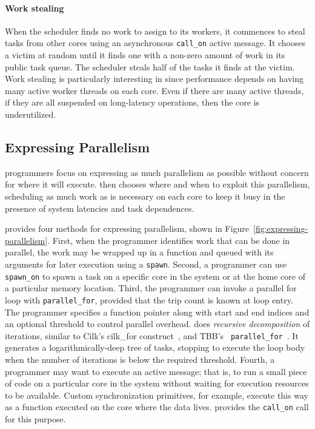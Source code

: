 \paragraph{Work stealing} 
When the scheduler finds no work to assign to its workers, it commences to
steal tasks from other cores using an asynchronous \texttt{call\_on} active
message. It chooses a victim at random until it finds one with a non-zero
amount of work in its public task queue. The scheduler steals half of the
tasks it finds at the victim. Work stealing is particularly interesting in
\Grappa since performance depends on having many active worker threads on each
core. Even if there are many active threads, if they are all suspended on
long-latency operations, then the core is underutilized.

\subsection{Expressing Parallelism}

\Grappa programmers focus on expressing as much parallelism as possible
without concern for where it will execute. \Grappa then chooses where and when
to exploit this parallelism, scheduling as much work as is necessary on each
core to keep it busy in the presence of system latencies and task dependences.

\Grappa provides four methods for expressing parallelism, shown in
Figure~\ref{fig:expressing-parallelism}. First, when the programmer identifies
work that can be done in parallel, the work may be wrapped up in a function
and queued with its arguments for later execution using a \texttt{spawn}.
Second, a programmer can use \texttt{spawn\_on} to spawn a task on a specific
core in the system or at the home core of a particular memory location. Third,
the programmer can invoke a parallel for loop with \texttt{parallel\_for}, provided that the trip count is
known at loop entry. The programmer specifies a function pointer along with
start and end indices and an optional threshold to control parallel overhead.
\Grappa does {\em recursive decomposition} of iterations, similar to Cilk's
cilk\_for construct~\cite {cilkforimplementation}, and TBB's {\tt
parallel\_for}~\cite{intel_tbb}. It generates a logarithmically-deep tree of
tasks, stopping to execute the loop body when the number of iterations is
below the required threshold. Fourth, a programmer may want to execute an active message; that is, to run a
small piece of code on a particular core in the system without waiting for
execution resources to be available. Custom synchronization primitives, for example, execute this way as a function executed on the core where the data
lives. \Grappa provides the \texttt{call\_on} call for this purpose.

